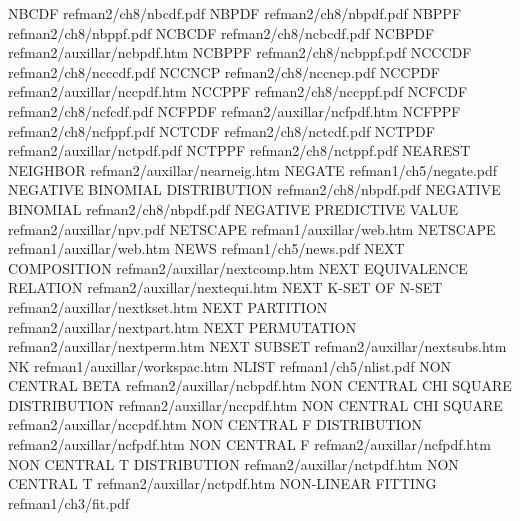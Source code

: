 NBCDF                                   refman2/ch8/nbcdf.pdf
NBPDF                                   refman2/ch8/nbpdf.pdf
NBPPF                                   refman2/ch8/nbppf.pdf
NCBCDF                                  refman2/ch8/ncbcdf.pdf
NCBPDF                                  refman2/auxillar/ncbpdf.htm
NCBPPF                                  refman2/ch8/ncbppf.pdf
NCCCDF                                  refman2/ch8/ncccdf.pdf
NCCNCP                                  refman2/ch8/nccncp.pdf
NCCPDF                                  refman2/auxillar/nccpdf.htm
NCCPPF                                  refman2/ch8/nccppf.pdf
NCFCDF                                  refman2/ch8/ncfcdf.pdf
NCFPDF                                  refman2/auxillar/ncfpdf.htm
NCFPPF                                  refman2/ch8/ncfppf.pdf
NCTCDF                                  refman2/ch8/nctcdf.pdf
NCTPDF                                  refman2/auxillar/nctpdf.pdf
NCTPPF                                  refman2/ch8/nctppf.pdf
NEAREST NEIGHBOR                        refman2/auxillar/nearneig.htm
NEGATE                                  refman1/ch5/negate.pdf
NEGATIVE BINOMIAL DISTRIBUTION          refman2/ch8/nbpdf.pdf
NEGATIVE BINOMIAL                       refman2/ch8/nbpdf.pdf
NEGATIVE PREDICTIVE VALUE               refman2/auxillar/npv.pdf
NETSCAPE                                refman1/auxillar/web.htm
NETSCAPE                                refman1/auxillar/web.htm
NEWS                                    refman1/ch5/news.pdf
NEXT COMPOSITION                        refman2/auxillar/nextcomp.htm
NEXT EQUIVALENCE RELATION               refman2/auxillar/nextequi.htm
NEXT K-SET OF N-SET                     refman2/auxillar/nextkset.htm
NEXT PARTITION                          refman2/auxillar/nextpart.htm
NEXT PERMUTATION                        refman2/auxillar/nextperm.htm
NEXT SUBSET                             refman2/auxillar/nextsubs.htm
NK                                      refman1/auxillar/workspac.htm
NLIST                                   refman1/ch5/nlist.pdf
NON CENTRAL BETA                        refman2/auxillar/ncbpdf.htm
NON CENTRAL CHI SQUARE DISTRIBUTION     refman2/auxillar/nccpdf.htm
NON CENTRAL CHI SQUARE                  refman2/auxillar/nccpdf.htm
NON CENTRAL F DISTRIBUTION              refman2/auxillar/ncfpdf.htm
NON CENTRAL F                           refman2/auxillar/ncfpdf.htm
NON CENTRAL T DISTRIBUTION              refman2/auxillar/nctpdf.htm
NON CENTRAL T                           refman2/auxillar/nctpdf.htm
NON-LINEAR FITTING                      refman1/ch3/fit.pdf
